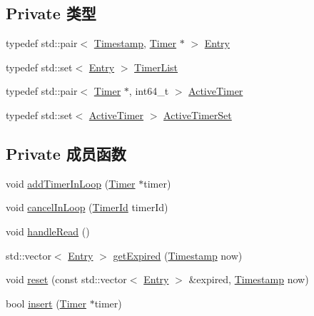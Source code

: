 \subsection*{Private 类型}
\begin{DoxyCompactItemize}
\item 
typedef std\+::pair$<$ \hyperlink{classmuduo_1_1Timestamp}{Timestamp}, \hyperlink{classmuduo_1_1Timer}{Timer} $\ast$ $>$ \hyperlink{classmuduo_1_1TimerQueue_aa2bab77baf38279fd11dcfcbf8fb15d8}{Entry}
\item 
typedef std\+::set$<$ \hyperlink{classmuduo_1_1TimerQueue_aa2bab77baf38279fd11dcfcbf8fb15d8}{Entry} $>$ \hyperlink{classmuduo_1_1TimerQueue_aeb83ff8eddb4b17cb88a9c3dab7268a2}{Timer\+List}
\item 
typedef std\+::pair$<$ \hyperlink{classmuduo_1_1Timer}{Timer} $\ast$, int64\+\_\+t $>$ \hyperlink{classmuduo_1_1TimerQueue_a8559b2c5a91f664c629dc1292d484e16}{Active\+Timer}
\item 
typedef std\+::set$<$ \hyperlink{classmuduo_1_1TimerQueue_a8559b2c5a91f664c629dc1292d484e16}{Active\+Timer} $>$ \hyperlink{classmuduo_1_1TimerQueue_ac4562f9443eea7ea7d16c2eab2dad988}{Active\+Timer\+Set}
\end{DoxyCompactItemize}
\subsection*{Private 成员函数}
\begin{DoxyCompactItemize}
\item 
void \hyperlink{classmuduo_1_1TimerQueue_adff791c94ab893d2adae1eafe03713ad}{add\+Timer\+In\+Loop} (\hyperlink{classmuduo_1_1Timer}{Timer} $\ast$timer)
\item 
void \hyperlink{classmuduo_1_1TimerQueue_abc59bed63190c00d9aab9281a543ea58}{cancel\+In\+Loop} (\hyperlink{classmuduo_1_1TimerId}{Timer\+Id} timer\+Id)
\item 
void \hyperlink{classmuduo_1_1TimerQueue_a231ec0ec0313193a59b3f1326328ae50}{handle\+Read} ()
\item 
std\+::vector$<$ \hyperlink{classmuduo_1_1TimerQueue_aa2bab77baf38279fd11dcfcbf8fb15d8}{Entry} $>$ \hyperlink{classmuduo_1_1TimerQueue_a4475fc9e3cda425c7f71b9d3e00e840a}{get\+Expired} (\hyperlink{classmuduo_1_1Timestamp}{Timestamp} now)
\item 
void \hyperlink{classmuduo_1_1TimerQueue_ac59fd8ddc045aae320982a0913993237}{reset} (const std\+::vector$<$ \hyperlink{classmuduo_1_1TimerQueue_aa2bab77baf38279fd11dcfcbf8fb15d8}{Entry} $>$ \&expired, \hyperlink{classmuduo_1_1Timestamp}{Timestamp} now)
\item 
bool \hyperlink{classmuduo_1_1TimerQueue_ac4bdfea344ee2a30857d2eabadfef399}{insert} (\hyperlink{classmuduo_1_1Timer}{Timer} $\ast$timer)
\end{DoxyCompactItemize}
